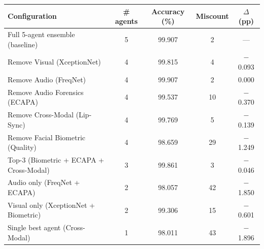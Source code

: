 \begin{tabular}{lcccc}
\toprule
Configuration & \# agents & Accuracy (\%) & Miscount & $\Delta$ (pp) \\
\midrule
Full 5-agent ensemble (baseline) & 5 & 99.907 & 2 & --- \\
\midrule
Remove Visual (XceptionNet) & 4 & 99.815 & 4 & $-$0.093 \\
Remove Audio (FreqNet) & 4 & 99.907 & 2 & 0.000 \\
Remove Audio Forensics (ECAPA) & 4 & 99.537 & 10 & $-$0.370 \\
Remove Cross-Modal (Lip-Sync) & 4 & 99.769 & 5 & $-$0.139 \\
Remove Facial Biometric (Quality) & 4 & 98.659 & 29 & $-$1.249 \\
Top-3 (Biometric + ECAPA + Cross-Modal) & 3 & 99.861 & 3 & $-$0.046 \\
Audio only (FreqNet + ECAPA) & 2 & 98.057 & 42 & $-$1.850 \\
Visual only (XceptionNet + Biometric) & 2 & 99.306 & 15 & $-$0.601 \\
Single best agent (Cross-Modal) & 1 & 98.011 & 43 & $-$1.896 \\
\bottomrule
\end{tabular}
